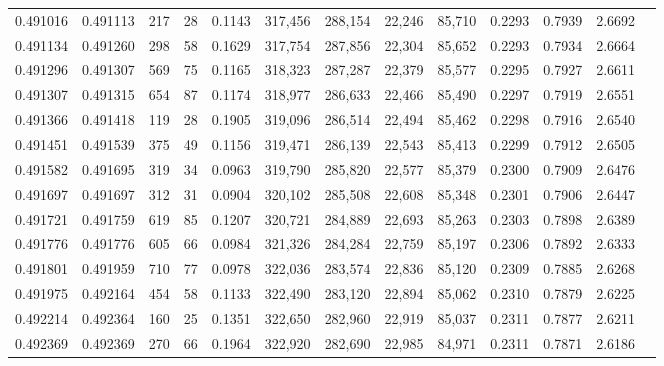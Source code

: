 \begin{tabular}{rrrrrrrrrrrrr}
0.491016 & 0.491113 &   217 &    28 &                                     0.1143 & 317,456 & 288,154 &  22,246 &  85,710 & 0.2293 & 0.7939 & 2.6692 \\
0.491134 & 0.491260 &   298 &    58 &                                     0.1629 & 317,754 & 287,856 &  22,304 &  85,652 & 0.2293 & 0.7934 & 2.6664 \\
0.491296 & 0.491307 &   569 &    75 &                                     0.1165 & 318,323 & 287,287 &  22,379 &  85,577 & 0.2295 & 0.7927 & 2.6611 \\
0.491307 & 0.491315 &   654 &    87 &                                     0.1174 & 318,977 & 286,633 &  22,466 &  85,490 & 0.2297 & 0.7919 & 2.6551 \\
0.491366 & 0.491418 &   119 &    28 &                                     0.1905 & 319,096 & 286,514 &  22,494 &  85,462 & 0.2298 & 0.7916 & 2.6540 \\
0.491451 & 0.491539 &   375 &    49 &                                     0.1156 & 319,471 & 286,139 &  22,543 &  85,413 & 0.2299 & 0.7912 & 2.6505 \\
0.491582 & 0.491695 &   319 &    34 &                                     0.0963 & 319,790 & 285,820 &  22,577 &  85,379 & 0.2300 & 0.7909 & 2.6476 \\
0.491697 & 0.491697 &   312 &    31 &                                     0.0904 & 320,102 & 285,508 &  22,608 &  85,348 & 0.2301 & 0.7906 & 2.6447 \\
0.491721 & 0.491759 &   619 &    85 &                                     0.1207 & 320,721 & 284,889 &  22,693 &  85,263 & 0.2303 & 0.7898 & 2.6389 \\
0.491776 & 0.491776 &   605 &    66 &                                     0.0984 & 321,326 & 284,284 &  22,759 &  85,197 & 0.2306 & 0.7892 & 2.6333 \\
0.491801 & 0.491959 &   710 &    77 &                                     0.0978 & 322,036 & 283,574 &  22,836 &  85,120 & 0.2309 & 0.7885 & 2.6268 \\
0.491975 & 0.492164 &   454 &    58 &                                     0.1133 & 322,490 & 283,120 &  22,894 &  85,062 & 0.2310 & 0.7879 & 2.6225 \\
0.492214 & 0.492364 &   160 &    25 &                                     0.1351 & 322,650 & 282,960 &  22,919 &  85,037 & 0.2311 & 0.7877 & 2.6211 \\
0.492369 & 0.492369 &   270 &    66 &                                     0.1964 & 322,920 & 282,690 &  22,985 &  84,971 & 0.2311 & 0.7871 & 2.6186 \\

\end{tabular}
